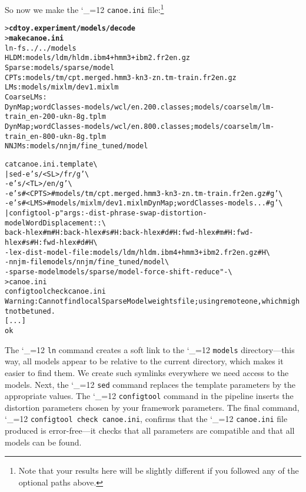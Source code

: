 \documentclass[11pt,letterpaper]{article}
\newcommand{\bs}{\textbackslash{}}
\def\code{\begingroup\catcode`\_=12 \codex}
\newcommand{\codex}[1]{\texttt{#1}\endgroup}
\begin{document}
So now we make the \code{canoe.ini} file:\footnote{Note that your results here
will be slightly different if you followed any of the optional paths above.}
\begin{small}
\begin{alltt}
   > \textbf{cd toy.experiment/models/decode}
   > \textbf{make canoe.ini}
   ln -fs ../../models
   HLDM: models/ldm/hldm.ibm4+hmm3+ibm2.fr2en.gz
   Sparse: models/sparse/model
   CPTs: models/tm/cpt.merged.hmm3-kn3-zn.tm-train.fr2en.gz
   LMs: models/mixlm/dev1.mixlm
   Coarse LMs:
      DynMap;wordClasses-models/wcl/en.200.classes;models/coarselm/lm-train_en-200-ukn-8g.tplm
      DynMap;wordClasses-models/wcl/en.800.classes;models/coarselm/lm-train_en-800-ukn-8g.tplm
   NNJMs: models/nnjm/fine_tuned/model

   cat canoe.ini.template \bs
      | sed -e 's/<SL>/fr/g' \bs
            -e 's/<TL>/en/g' \bs
            -e 's#<CPTS>#models/tm/cpt.merged.hmm3-kn3-zn.tm-train.fr2en.gz#g' \bs
            -e 's#<LMS>#models/mixlm/dev1.mixlm DynMap;wordClasses-models...#g' \bs
      | configtool -p "args: -dist-phrase-swap -distortion-model WordDisplacement::\bs
        back-hlex#m#H:back-hlex#s#H:back-hlex#d#H:fwd-hlex#m#H:fwd-hlex#s#H:fwd-hlex#d#H \bs
        -lex-dist-model-file :models/ldm/hldm.ibm4+hmm3+ibm2.fr2en.gz#H \bs
        -nnjm-file models/nnjm/fine_tuned/model \bs
        -sparse-model models/sparse/model -force-shift-reduce " - \bs
      > canoe.ini
   configtool check canoe.ini
   Warning: Cannot find local SparseModel weights file; using remote one, which might not be tuned.
   [...]
   ok
\end{alltt}
\end{small}
The \code{ln} command creates a soft link to the \code{models} directory---this way, all
models appear to be relative to the current directory, which makes it easier to
find them.  We create such symlinks everywhere we need access to the models.
Next, the \code{sed} command replaces the template parameters by the appropriate
values.  The \code{configtool} command in the pipeline inserts the distortion
parameters chosen by your framework parameters.  The final command, \code{configtool check
canoe.ini}, confirms that the \code{canoe.ini} file produced is error-free---it
checks that all parameters are compatible and that all models can be found.
\end{document}
